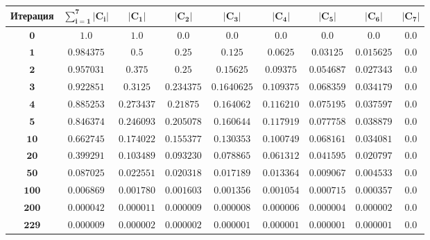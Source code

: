	\noindent %
	\begin{minipage}{\textwidth}
		\vspace{\mfloatsep} %
		\centering\small
		\label{tab:constarint-values}
		\begin{tabular}{|c|c|c|c|c|c|c|c|c|}
			\hline
			\textbf{Итерация} & $\mathbf{\sum_{i = 1}^{7}|C_i|}$ & $\mathbf{|C_1|}$ & $\mathbf{|C_2|}$ & $\mathbf{|C_3|}$ & $\mathbf{|C_4|}$ & $\mathbf{|C_5|}$ & $\mathbf{|C_6|}$ & $\mathbf{|C_7|}$ \\
			\hline
			$\mathbf{0}$ & $1.0$ & $1.0$ & $0.0$ & $0.0$ & $0.0$ & $0.0$ & $0.0$ & $0.0$ \\ \hline
			$\mathbf{1}$ & $0.984375$ & $0.5$ & $0.25$ & $0.125$ & $0.0625$ & $0.03125$ & $0.015625$ & $0.0$ \\ \hline
			$\mathbf{2}$ & $0.957031$ & $0.375$ & $0.25$ & $0.15625$ & $0.09375$ & $0.054687$ & $0.027343$ & $0.0$ \\ \hline
			$\mathbf{3}$ & $0.922851$ & $0.3125$ & $0.234375$ & $0.1640625$ & $0.109375$ & $0.068359$ & $0.034179$ & $0.0$ \\ \hline
			$\mathbf{4}$ & $0.885253$ & $0.273437$ & $0.21875$ & $0.164062$ & $0.116210$ & $0.075195$ & $0.037597$ & $0.0$ \\ \hline
			$\mathbf{5}$ & $0.846374$ & $0.246093$ & $0.205078$ & $0.160644$ & $0.117919$ & $0.077758$ & $0.038879$ & $0.0$ \\ \hline
			$\mathbf{10}$ & $0.662745$ & $0.174022$ & $0.155377$ & $0.130353$ & $0.100749$ & $0.068161$ & $0.034081$ & $0.0$ \\ \hline
			$\mathbf{20}$ & $0.399291$ & $0.103489$ & $0.093230$ & $0.078865$ & $0.061312$ & $0.041595$ & $0.020797$ & $0.0$ \\ \hline
			$\mathbf{50}$ & $0.087025$ & $0.022551$ & $0.020318$ & $0.017189$ & $0.013364$ & $0.009067$ & $0.004533$ & $0.0$ \\ \hline
			$\mathbf{100}$ & $0.006869$ & $0.001780$ & $0.001603$ & $0.001356$ & $0.001054$ & $0.000715$ & $0.000357$ & $0.0$ \\ \hline
			$\mathbf{200}$ & $0.000042$ & $0.000011$ & $0.000009$ & $0.000008$ & $0.000006$ & $0.000004$ & $0.000002$ & $0.0$ \\ \hline
			$\mathbf{229}$ & $0.000009$ & $0.000002$ & $0.000002$ & $0.000001$ & $0.000001$ & $0.000001$ & $0.000001$ & $0.0$ \\ \hline
		\end{tabular}
		\vspace{\mfloatsep} %
		\normalsize %
	\end{minipage} 
	
